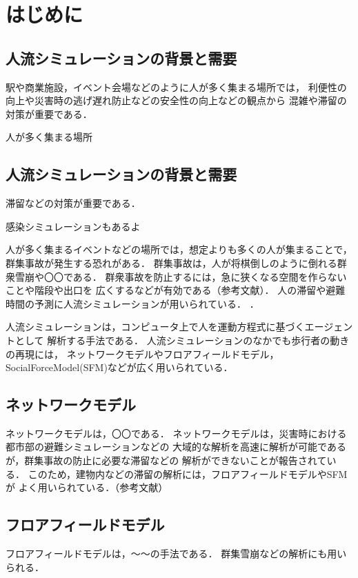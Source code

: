 \newcommand{\tensaku}[1]{#1}

\chapter{はじめに}
\label{sec:intro}
\tensaku{\section{人流シミュレーションの背景と需要}}
駅や商業施設，イベント会場などのように人が多く集まる場所では，
利便性の向上や災害時の逃げ遅れ防止などの安全性の向上などの観点から
混雑や滞留の対策が重要である．


人が多く集まる場所




\tensaku{\section{人流シミュレーションの背景と需要}}
滞留などの対策が重要である\cite{taisaku1}\cite{taisaku2}．

感染シミュレーションもあるよ\cite{mas_pandemic}

人が多く集まるイベントなどの場所では，想定よりも多くの人が集まることで，
群集事故が発生する恐れがある．
群集事故は，人が将棋倒しのように倒れる群衆雪崩や〇〇である．
群衆事故を防止するには，急に狭くなる空間を作らないことや階段や出口を
広くするなどが有効である（参考文献）．
人の滞留や避難時間の予測に人流シミュレーションが用いられている．
\cite{sim_jirei1}\cite{sim_jirei2}\cite{sim_jirei3}\cite{sim_jirei8}\cite{sim_jirei7}．

人流シミュレーションは，コンピュータ上で人を運動方程式に基づくエージェントとして
解析する手法である．
人流シミュレーションのなかでも歩行者の動きの再現には，
ネットワークモデルやフロアフィールドモデル，SocialForceModel(SFM)などが広く用いられている\cite{helbing_sfm}\cite{sfm_ntt}．
\tensaku{\section{ネットワークモデル}}
ネットワークモデルは，〇〇である．
ネットワークモデルは，災害時における都市部の避難シミュレーションなどの
大域的な解析を高速に解析が可能であるが，群集事故の防止に必要な滞留などの
解析ができないことが報告されている．
このため，建物内などの滞留の解析には，フロアフィールドモデルやSFMが
よく用いられている．（参考文献）
\tensaku{\section{フロアフィールドモデル}}
フロアフィールドモデルは，～～の手法である\cite{floa_field1}\cite{floa_field2}．
群集雪崩などの解析にも用いられる\cite{floa_field3}．



